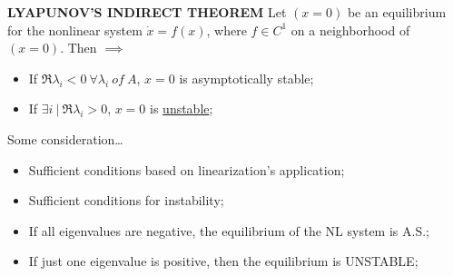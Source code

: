 \begin{thrm}{\textbf{LYAPUNOV'S INDIRECT THEOREM}} \newline
Let $(x=0)$ be an equilibrium for the nonlinear system $\dot{x}=f(x)$, where $f \in C^1$ on a neighborhood of $(x=0)$. Then $\implies$
\begin{itemize}
\item If $\Re{\lambda_i} < 0\ \forall \lambda_i\ of\ A$, $x=0$ is asymptotically stable;
\item If $\exists i\ |\ \Re{\lambda_i} > 0$, $x=0$ is \underline{unstable};
\end{itemize}
\end{thrm}

Some consideration\dots
\begin{itemize}
\item Sufficient conditions based on linearization's application;
\item Sufficient conditions for instability;
\item If all eigenvalues are negative, the equilibrium of the NL system is A.S.;
\item If just one eigenvalue is positive, then the equilibrium is UNSTABLE;
\end{itemize}

